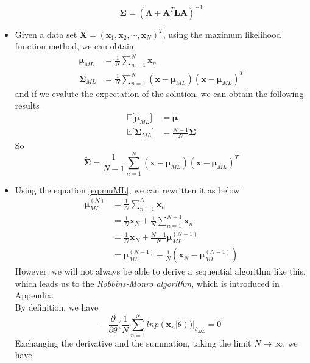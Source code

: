 \documentclass[12pt, a4paper]{article}
\newcommand{\E}{\mathbb{E}}
\begin{document}
\begin{itemize}
        \begin{equation*}
            \bm{\Sigma}=(\bm{\Lambda}+\bm{A}^T\bm{LA})^{-1}
        \end{equation*}
        \item Given a data set $\bm{X}=(\bm{x}_1,\bm{x}_2,\cdots,\bm{x}_N)^T$, using the maximum likelihood
        function method, we can obtain
        \begin{align}
            \label{eq:muML}
            \bm{\mu}_{ML}&=\frac{1}{N}\sum_{n=1}^N\bm{x}_n\\
            \bm{\Sigma}_{ML}&=\frac{1}{N}\sum_{n=1}^N(\bm{x}-\bm{\mu}_{ML})(\bm{x}-\bm{\mu}_{ML})^T
        \end{align}
        and if we evalute the expectation of the solution, we can obtain the following results
        \begin{align*}
            \E\lbrack\bm{\mu}_{ML}\rbrack&=\bm{\mu}\\
            \E\lbrack\bm{\Sigma}_{ML}\rbrack&=\frac{N-1}{N}\bm{\Sigma}
        \end{align*}
        So
        \begin{equation*}
            \widetilde{\bm{\Sigma}}=\frac{1}{N-1}\sum_{n=1}^N(\bm{x}-\bm{\mu}_{ML})(\bm{x}-\bm{\mu}_{ML})^T
        \end{equation*}
        \item  Using the equation \ref{eq:muML}, we can rewritten it as below
        \begin{align}
            \label{eq:muMLSeq}
            \bm{\mu}_{ML}^{(N)} &= \frac{1}{N}\sum_{n=1}^N\bm{x}_n\nonumber\\
            &=\frac{1}{N}\bm{x}_N+\frac{1}{N}\sum_{n=1}^{N-1}\bm{x}_n\nonumber\\
            &=\frac{1}{N}\bm{x}_N+\frac{N-1}{N}\bm{\mu}_{ML}^{(N-1)}\nonumber\\
            &=\bm{\mu}_{ML}^{(N-1)}+\frac{1}{N}(\bm{x}_N-\bm{\mu}_{ML}^{(N-1)})
        \end{align}
        However, we will not always be able to derive a sequential algorithm like this, which leads us to
        the \textit{Robbins-Monro algorithm}, which is introduced in Appendix.\\
        By definition, we have
        \begin{equation*}
            -\frac{\partial}{\partial{\theta}}\Big(\frac{1}{N}\sum_{n=1}^Nlnp(\bm{x}_n|\theta)\Big)
            \Big\vert_{\theta_{ML}}=0
        \end{equation*}
        Exchanging the derivative and the summation, taking the limit $N\rightarrow\infty$, we have

\end{itemize}
\end{document}
